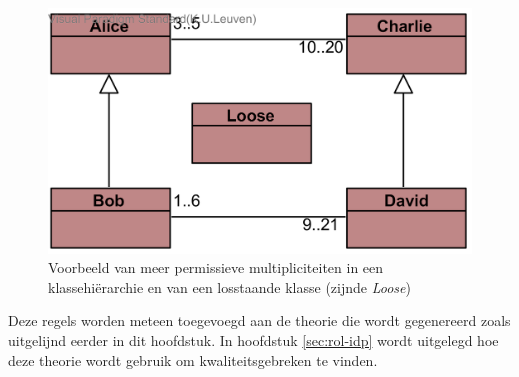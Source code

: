 \begin{figure}
	\includegraphics{chap-kwaliteitsgebrek/hierarchy.png}
	\caption{Voorbeeld van meer permissieve multipliciteiten in een klassehi\"erarchie en van een losstaande klasse (zijnde \textit{Loose})}
	\label{fig:hierarchie}
\end{figure}

Deze regels worden meteen toegevoegd aan de theorie die wordt gegenereerd zoals uitgelijnd eerder in dit hoofdstuk. In hoofdstuk \ref{sec:rol-idp} wordt uitgelegd hoe deze theorie wordt gebruik om kwaliteitsgebreken te vinden.